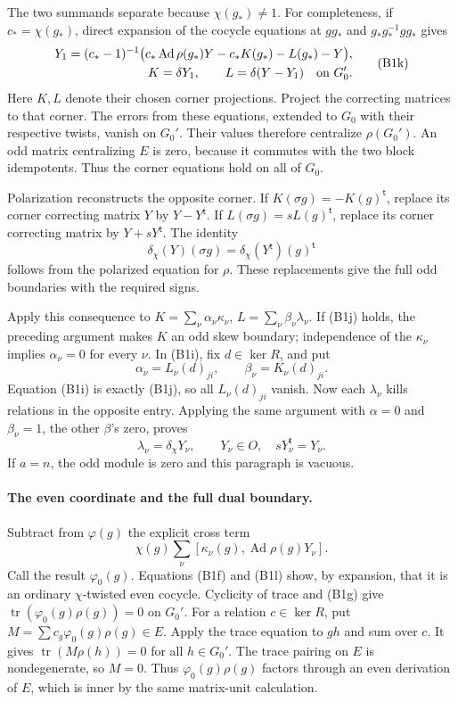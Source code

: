 The two summands separate because \(\chi(g_*)\ne1\).
For completeness, if \(c_*=\chi(g_*)\), direct expansion of
the cocycle equations at \(g g_*\) and \(g_*g_*^{-1}gg_*\)
gives
\[
 \begin{split}
 Y_1=(c_*-1)^{-1}\bigl(
  c_*\operatorname{Ad}\rho(g_*)Y
             -c_*K(g_*)-L(g_*)-Y\bigr),\\
             K=\delta Y_1,\qquad L=\delta(Y-Y_1)
                                \quad\hbox{on }G_0'.
 \end{split}
 \tag{B1k}
\]
Here \(K,L\) denote their chosen corner projections.
Project the correcting matrices to that corner.
The errors from these equations, extended to \(G_0\) with their
respective twists, vanish on \(G_0'\).
Their values therefore centralize \(\rho(G_0')\).
An odd matrix centralizing \(E\) is zero, because it commutes
with the two block idempotents.
Thus the corner equations hold on all of \(G_0\).

Polarization reconstructs the opposite corner.
If \(K(\sigma g)=-K(g)^{\mathsf t}\), replace its corner
correcting matrix \(Y\) by \(Y-Y^{\mathsf t}\).
If \(L(\sigma g)=sL(g)^{\mathsf t}\), replace its corner
correcting matrix by \(Y+sY^{\mathsf t}\).
The identity
\[
        \delta_\chi(Y)(\sigma g)
                        =\delta_\chi(Y^{\mathsf t})(g)^{\mathsf t}
\]
follows from the polarized equation for \(\rho\).
These replacements give the full odd boundaries with the
required signs.

Apply this consequence to
\(K=\sum_\nu\alpha_\nu\kappa_\nu\),
\(L=\sum_\nu\beta_\nu\lambda_\nu\).
If (B1j) holds, the preceding argument makes \(K\) an odd skew
boundary; independence of the \(\kappa_\nu\) implies
\(\alpha_\nu=0\) for every \(\nu\).
In (B1i), fix \(d\in\ker R\), and put
\[
                 \alpha_\nu=L_\nu(d)_{ji},\qquad
                 \beta_\nu=K_\nu(d)_{ji}.
\]
Equation (B1i) is exactly (B1j), so all
\(L_\nu(d)_{ji}\) vanish.
Now each \(\lambda_\nu\) kills relations in the opposite entry.
Applying the same argument with \(\alpha=0\) and
\(\beta_\nu=1\), the other \(\beta\)'s zero, proves
\[
        \lambda_\nu=\delta_\chi Y_\nu,\qquad
                Y_\nu\in O,\quad sY_\nu^{\mathsf t}=Y_\nu .
 \tag{B1l}
\]
If \(a=n\), the odd module is zero and this paragraph is vacuous.

\paragraph{The even coordinate and the full dual boundary.}
Subtract from \(\varphi(g)\) the explicit cross term
\[
             \chi(g)\sum_\nu
                  [\kappa_\nu(g),\operatorname{Ad}\rho(g)Y_\nu].
\]
Call the result \(\varphi_0(g)\).
Equations (B1f) and (B1l) show, by expansion, that it is an
ordinary \(\chi\)-twisted even cocycle.
Cyclicity of trace and (B1g) give
\(\operatorname{tr}(\varphi_0(g)\rho(g))=0\) on \(G_0'\).
For a relation \(c\in\ker R\), put
\(M=\sum c_g\varphi_0(g)\rho(g)\in E\).
Apply the trace equation to \(gh\) and sum over \(c\).
It gives \(\operatorname{tr}(M\rho(h))=0\) for all \(h\in G_0'\).
The trace pairing on \(E\) is nondegenerate, so \(M=0\).
Thus \(\varphi_0(g)\rho(g)\) factors through an even derivation
of \(E\), which is inner by the same matrix-unit calculation.

